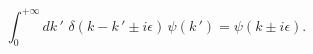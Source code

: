 \begin{equation}\label{delta}
\int_0^{+\infty} dk\,'\,\,\delta(k-k\,'\pm i\epsilon)
\,\psi (k\,')=\psi (k \pm i\epsilon).
\end{equation}


